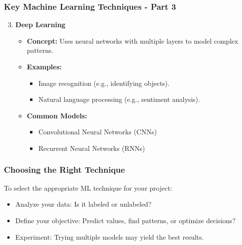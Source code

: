 \documentclass[aspectratio=169]{beamer}
\begin{document}
\begin{frame}[fragile]
    \frametitle{Key Machine Learning Techniques - Part 3}
    \begin{enumerate}
        \setcounter{enumi}{2}
        \item \textbf{Deep Learning}
        \begin{itemize}
            \item \textbf{Concept:} Uses neural networks with multiple layers to model complex patterns.
            \item \textbf{Examples:}
            \begin{itemize}
                \item Image recognition (e.g., identifying objects).
                \item Natural language processing (e.g., sentiment analysis).
            \end{itemize}
            \item \textbf{Common Models:}
            \begin{itemize}
                \item Convolutional Neural Networks (CNNs)
                \item Recurrent Neural Networks (RNNs)
            \end{itemize}
        \end{itemize}
    \end{enumerate}
\end{frame}

\begin{frame}[fragile]
    \frametitle{Choosing the Right Technique}
    To select the appropriate ML technique for your project:
    \begin{itemize}
        \item Analyze your data: Is it labeled or unlabeled?
        \item Define your objective: Predict values, find patterns, or optimize decisions?
        \item Experiment: Trying multiple models may yield the best results.
    \end{itemize}
\end{frame}
\end{document}
